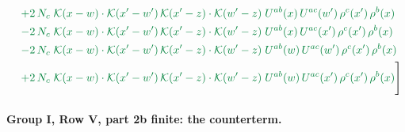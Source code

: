 \documentclass[10pt]{article}
\numberwithin{equation}{section}
\begin{document}
\begin{align}
&\quad{\color{JIM}+2\,N_c\;\mathcal{K}(x-w)\cdot\mathcal{K}(x'-w')\,\mathcal{K}(x'-z)\cdot\mathcal{K}(w'-z)\;U^{ab}(x)\,U^{ac}(w')\,\rho^{c}(x')\,\rho^{b}(x)}\notag\\
&\quad{\color{JIM}-2\,N_c\;\mathcal{K}(x-w)\cdot\mathcal{K}(x'-w')\,\mathcal{K}(x'-z)\cdot\mathcal{K}(w'-z)\;U^{ab}(x)\,U^{ac}(x')\,\rho^{c}(x')\,\rho^{b}(x)}\notag\\
&\quad{\color{JIM}-2\,N_c\;\mathcal{K}(x-w)\cdot\mathcal{K}(x'-w')\,\mathcal{K}(x'-z)\cdot\mathcal{K}(w'-z)\;U^{ab}(w)\,U^{ac}(w')\,\rho^{c}(x')\,\rho^{b}(x)}\notag\\
&\quad{\color{JIM}+2\,N_c\;\mathcal{K}(x-w)\cdot\mathcal{K}(x'-w')\,\mathcal{K}(x'-z)\cdot\mathcal{K}(w'-z)\;U^{ab}(w)\,U^{ac}(x')\,\rho^{c}(x')\,\rho^{b}(x)}\Bigg]\label{eq:gen3}
\end{align}
\paragraph{Group I, Row V, part 2b finite: the counterterm.}
\end{document}

